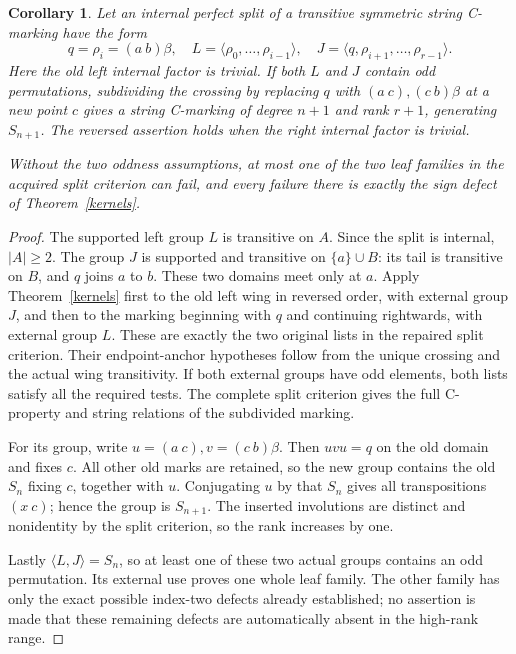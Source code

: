 \documentclass[11pt,a4paper]{article}
\newtheorem{corollary}[lemma]{Corollary}
\newcommand{\gen}[1]{\langle#1\rangle}
\begin{document}
\begin{corollary}\label{split}
Let an internal perfect split of a transitive symmetric string
C-marking have the form
\[
 q=\rho_i=(a\ b)\beta,
 \quad L=\gen{\rho_0,\ldots,\rho_{i-1}},\quad
 J=\gen{q,\rho_{i+1},\ldots,\rho_{r-1}}.
\]
Here the old left internal factor is trivial. If both $L$ and $J$
contain odd permutations, subdividing the crossing by replacing
$q$ with $(a\ c),(c\ b)\beta$ at a new point $c$ gives a string
C-marking of degree $n+1$ and rank $r+1$, generating $S_{n+1}$.
The reversed assertion holds when the right internal factor is trivial.

Without the two oddness assumptions, at most one of the two leaf
families in the acquired split criterion can fail, and every failure
there is exactly the sign defect of Theorem~\ref{kernels}.
\end{corollary}
\begin{proof}
The supported left group $L$ is transitive on $A$. Since the split
is internal, $|A|\ge2$. The group $J$ is supported and transitive
on $\{a\}\cup B$: its tail is transitive on $B$, and $q$
joins $a$ to $b$. These two domains meet only at $a$.
Apply Theorem~\ref{kernels} first to the old left wing in reversed
order, with external group $J$, and then to the marking beginning
with $q$ and continuing rightwards, with external group $L$.
These are exactly the two original lists in the repaired split
criterion. Their endpoint-anchor hypotheses follow from the unique
crossing and the actual wing transitivity. If both external groups
have odd elements, both lists satisfy all the required tests.
The complete split criterion gives the full C-property and string
relations of the subdivided marking.

For its group, write $u=(a\ c),v=(c\ b)\beta$.
Then $uvu=q$ on the old domain and fixes $c$.
All other old marks are retained, so the new group contains the old
$S_n$ fixing $c$, together with $u$. Conjugating $u$ by that $S_n$
gives all transpositions $(x\ c)$; hence the group is $S_{n+1}$.
The inserted involutions are distinct and nonidentity by the split
criterion, so the rank increases by one.

Lastly $\gen{L,J}=S_n$, so at least one of these two actual groups
contains an odd permutation. Its external use proves one whole leaf
family. The other family has only the exact possible index-two defects
already established; no assertion is made that these remaining defects
are automatically absent in the high-rank range.
\end{proof}
\end{document}
